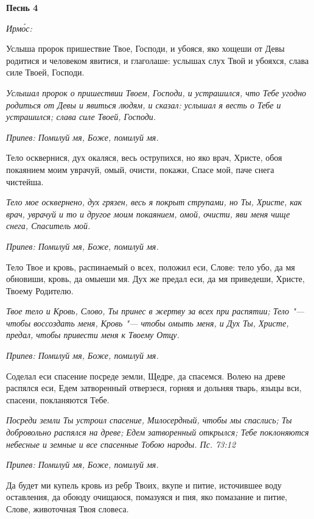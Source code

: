 \bfseries Песнь 4\normalfont{}


\itshape Ирмо́с:\normalfont{}


Услыша пророк пришествие Твое, Господи, и убояся, яко хощеши от Девы родитися и человеком явитися, и глаголаше: услышах слух Твой и убояхся, слава силе Твоей, Господи.


\itshape Услышал пророк о пришествии Твоем, Господи, и устрашился, что Тебе угодно родиться от Девы и явиться людям, и сказал: услышал я весть о Тебе и устрашился; слава силе Твоей, Господи.\normalfont{}


\itshape Припев:\normalfont{} Помилуй мя, Боже, помилуй мя.


Тело осквернися, дух окаляся, весь острупихся, но яко врач, Христе, обоя покаянием моим уврачуй, омый, очисти, покажи, Спасе мой, паче снега чистейша.


\itshape Тело мое осквернено, дух грязен, весь я покрыт струпами, но Ты, Христе, как врач, уврачуй и то и другое моим покаянием, омой, очисти, яви меня чище снега, Спаситель мой.\normalfont{}


\itshape Припев:\normalfont{} Помилуй мя, Боже, помилуй мя.


Тело Твое и кровь, распинаемый о всех, положил еси, Слове: тело убо, да мя обновиши, кровь, да омыеши мя. Дух же предал еси, да мя приведеши, Христе, Твоему Родителю.


\itshape Твое тело и Кровь, Слово, Ты принес в жертву за всех при распятии; Тело "--- чтобы воссоздать меня, Кровь "--- чтобы омыть меня, и Дух Ты, Христе, предал, чтобы привести меня к Твоему Отцу.\normalfont{}


\itshape Припев:\normalfont{} Помилуй мя, Боже, помилуй мя.


Соделал еси спасение посреде земли, Щедре, да спасемся. Волею на древе распялся еси, Едем затворенный отверзеся, горняя и дольняя тварь, языцы вси, спасени, покланяются Тебе.


\itshape Посреди земли Ты устроил спасение, Милосердный, чтобы мы спаслись; Ты добровольно распялся на древе; Едем затворенный открылся; Тебе поклоняются небесные и земные и все спасенные Тобою народы. Пс. 73:12\normalfont{}


\itshape Припев:\normalfont{} Помилуй мя, Боже, помилуй мя.


Да будет ми купель кровь из ребр Твоих, вкупе и питие, источившее воду оставления, да обоюду очищаюся, помазуяся и пия, яко помазание и питие, Слове, животочная Твоя словеса.



